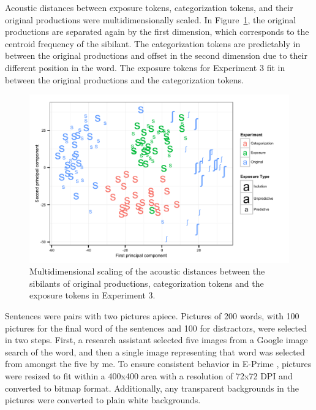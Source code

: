Acoustic distances between exposure tokens, categorization tokens, and their original productions were multidimensionally scaled.  In Figure~\ref{fig:exp3mds}, the original productions are separated again by the first dimension, which corresponds to the centroid frequency of the sibilant.
The categorization tokens are predictably in between the original productions and offset in the second dimension due to their different position in the word.
The exposure tokens for Experiment 3 fit in between the original productions and the categorization tokens.

\begin{figure}[ht]
\caption{Multidimensional scaling of the acoustic distances between the sibilants of original productions, categorization tokens and the exposure tokens in Experiment 3.}
\label{fig:exp3mds}
\begin{center}
\includegraphics[width=\textwidth]{graphs/exp3_mds}
\end{center}
\end{figure}

Sentences were pairs with two pictures apiece.
Pictures of 200 words, with 100 pictures for the final word of the sentences and 100 for distractors, were selected in two steps.  
First, a research assistant selected five images from a Google image search of the word, and then a single image representing that word was selected from amongst the five by me.  
To ensure consistent behavior in E-Prime \citep{PsychologySoftwareTools2012}, pictures were resized to fit within a 400x400 area with a resolution of 72x72 DPI and converted to bitmap format.  
Additionally, any transparent backgrounds in the pictures were converted to plain white backgrounds.

